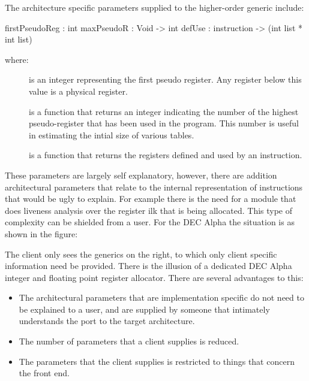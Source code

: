   The architecture specific parameters supplied to the higher-order
  generic include:
\begin{SML}
  firstPseudoReg : int
  maxPseudoR : Void -> int
  defUse : instruction -> (int list * int list)
\end{SML}

  where: 
\begin{description}  
    \item[] is an integer representing the first
    pseudo register. Any register below this value is a physical
    register.
 
    \item[] is a function that returns an
    integer indicating the number of the highest pseudo-register that
    has been used in the program. This number is useful in estimating
    the intial size of various tables.

    \item[] is a function that returns the
    registers defined and used by an instruction.
\end{description}

  These parameters are largely self explanatory, however, there are
  addition architectural parameters that relate to the internal
  representation of instructions that would be ugly to explain. For
  example there is the need for a module that does liveness analysis
  over the register ilk that is being allocated. This type of
  complexity can be shielded from a user.  For the DEC Alpha the
  situation is as shown in the figure:


  The client only sees the generics on the right, to which only client
  specific information need be provided. There is the illusion of a
  dedicated DEC Alpha integer and floating point register
  allocator. There are several advantages to this:
  \begin{itemize}
    \item The architectural parameters that are implementation specific
do not need to be explained to a user, and are supplied by someone
that intimately understands the port to the target architecture. 

     \item The number of parameters that a client supplies is
reduced.

     \item The parameters that the client supplies is restricted to
things that concern the front end. 
  \end{itemize}

